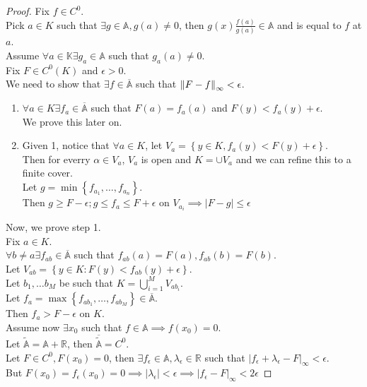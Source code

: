 \documentclass[../main.tex]{subfiles}
\begin{document}
\begin{proof}
Fix $ f\in C^{0}$.\\
Pick $a \in K$ such that $\exists g \in \mathbb{A}, g( a) \neq 0$, then $g( x) \frac{f( a) }{g( a) }\in \mathbb{A} $ and is equal to $f$ at $a$.\\
Assume $\forall a \in \mathbb{K} \exists g_a \in \mathbb{A}$ such that $g_a( a) \neq 0$.\\
Fix $F\in C^{0}( K) $ and $\epsilon>0$.\\
We need to show that $\exists f\in \overline{\mathbb{A}}$ such that $ \left\lVert F- f\right\rVert_{ \infty } < \epsilon$.\\
\begin{enumerate}
\item $\forall a \in K \exists f_a \in \overline{\mathbb{A}}$ such that $F( a) = f_a( a) $ and $F( y)  < f_a ( y) +\epsilon$.\\
	We prove this later on.
\item Given 1, notice that $\forall a \in K$, let $V_a = \left\{ y \in K, f_a( y) < F( y) + \epsilon  \right\} $.\\
	Then for everry $\alpha \in V_a$, $V_a$ is open and $K= \cup V_a$ and we can refine this to a finite cover.\\
	Let $g= \min \left\{ f_{a_1} ,\ldots, f_{a_n}   \right\} $.\\
	Then $g \geq F-\epsilon; g \leq  f_a \leq  F+ \epsilon$ on $V_{a_i} \implies |F-g | \leq \epsilon$ 
\end{enumerate}
Now, we prove step 1.\\
Fix $a\in K$.\\
$\forall b \neq a \exists f_{ab} \in \overline{\mathbb{A}}$ such that $f_{ab} ( a) = F( a) , f_{ab} ( b) = F( b) $.\\
Let $V_{ab} = \left\{ y \in K: F( y) < f_{ab} ( y) + \epsilon \right\} $.\\
Let $b_1, \ldots b_M$ be such that $K = \bigcup_{i=1}^{M} V_{ab_i} $.\\
Let $f_a= \max \left\{ f_{ab_1},\ldots, f_{ab_M}   \right\} \in \overline{\mathbb{A}}$.\\
Then $f_a > F - \epsilon$ on $K$.\\

Assume now $\exists x_0$ such that $f\in \mathbb{A}\implies f( x_0) =0$.\\
Let $ \tilde{ \mathbb{A}} = \mathbb{A}+ \mathbb{R}$, then $ \overline{\tilde{\mathbb{A}}}= C^{0}$.\\
Let $F\in C^{0}, F( x_0) =0$, then $\exists f_\epsilon \in \mathbb{A}, \lambda_\epsilon \in \mathbb{R}$ such that $| f_\epsilon + \lambda_\epsilon - F|_{ \infty } < \epsilon$.\\

But $F( x_0) = f_\epsilon( x_0) = 0 \implies |\lambda_\epsilon| < \epsilon\implies | f_\epsilon - F|_{ \infty } < 2 \epsilon$ 
\end{proof}
\end{document}

